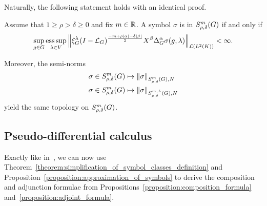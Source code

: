 Naturally,
the following statement holds with an identical proof.

\begin{theorem}
    Assume that $1 \geq \rho > \delta \geq 0$ and fix $m \in \mathbb{R}$.
    A symbol $\sigma$ is in $S^{m}_{\rho, \delta}(G)$ if and only if
    \begin{align*}
        \sup_{g \in \Group} \esssup_{\lambda \in \VectorSpace}
        \norm [\Lin {\Lebesgue 2 \CompactGroup}] {%
            \Rep \lambda \BesselPotential {-m + \rho \abs \alpha - \delta \abs \beta}
            \LeftDifferentialOperator \beta
            \DifferenceOperatorOrder \alpha
            \sigma(g, \lambda)
        } < \infty.
    \end{align*}

    Moreover,
    the semi-norms
    \begin{align*}
        &\sigma \in S^{m}_{\rho, \delta}(G) \mapsto {\left\| \sigma \right\|}_{S^{m}_{\rho, \delta}(G), N}\\
        &\sigma \in S^{m}_{\rho, \delta}(G) \mapsto {\left\| \sigma \right\|}_{S^{m, L}_{\rho, \delta}(G), N}
    \end{align*}
    yield the same topology on $S^{m}_{\rho, \delta}(G)$.
\end{theorem}

\subsection{Pseudo-differential calculus}
\label{subsection:pseudo-differential_calculus}

Exactly like in~\cite{FischerRuzhansky16},
we can now use Theorem~\ref{theorem:simplification_of_symbol_classes_definition} and Proposition~\ref{proposition:approximation_of_symbols} to derive the composition and adjunction formulae from
Propositions~\ref{proposition:composition_formula} and~\ref{proposition:adjoint_formula}.


